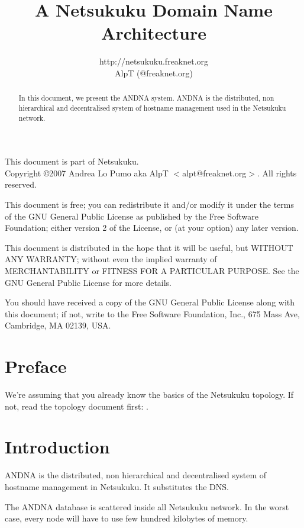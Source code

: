 \documentclass[a4paper]{article}
\title{A Netsukuku Domain Name Architecture}
\author{http://netsukuku.freaknet.org\\AlpT (@freaknet.org)}
\begin{document}
\maketitle

\begin{abstract}
	In this document, we present the ANDNA system.
	ANDNA is the distributed, non hierarchical and
	decentralised system of hostname management used in the Netsukuku
	network.
\end{abstract}
\pagebreak
\begin{small}
  This document is part of Netsukuku.\\
  Copyright \copyright 2007 Andrea Lo Pumo aka AlpT $<$alpt@freaknet.org$>$.
  All rights reserved.

  This document is free; you can redistribute it and/or modify it
  under the terms of the GNU General Public License as published by
  the Free Software Foundation; either version 2 of the License, or
  (at your option) any later version.

  This document is distributed in the hope that it will be useful, but
  WITHOUT ANY WARRANTY; without even the implied warranty of
  MERCHANTABILITY or FITNESS FOR A PARTICULAR PURPOSE\@.  See the GNU
  General Public License for more details.

  You should have received a copy of the GNU General Public License
  along with this document; if not, write to the Free Software
  Foundation, Inc., 675 Mass Ave, Cambridge, MA 02139, USA.
\end{small}

\clearpage
\tableofcontents
\clearpage
{}
\section{Preface}
\label{sec:preface}

We're assuming that you already know the basics of the Netsukuku topology. If not, read the
topology document first: \cite{ntktopology}.

\section{Introduction}
ANDNA is the distributed, non hierarchical and decentralised system of
hostname management in Netsukuku. It substitutes the DNS. 

The ANDNA database is scattered inside all Netsukuku network. In the worst
case, every node will have to use few hundred kilobytes of memory.
\end{document}
